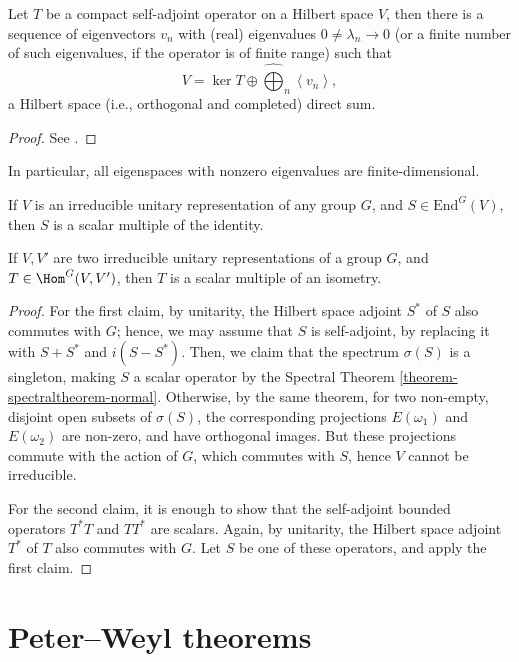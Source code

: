 \begin{theorem}
\label{theorem-spectraltheorem-compact} 
 Let $T$ be a compact self-adjoint operator on a Hilbert space $V$, then there is a sequence of eigenvectors $v_n$ with (real) eigenvalues $0\ne\lambda_n\to 0$ (or a finite number of such eigenvalues, if the operator is of finite range) such that 
 $$V = \ker T \oplus \hat{\bigoplus}_n \left< v_n\right>,$$
a Hilbert space (i.e., orthogonal and completed) direct sum. 
\end{theorem}

\begin{proof}
 See \cite[Theorem 12.30]{Rudin}.
\end{proof}


In particular, all eigenspaces with nonzero eigenvalues are finite-dimensional.


\begin{theorem}
\label{theorem-Schurslemma}
 If $V$ is an irreducible unitary representation of any group $G$, and $S\in \text{End}^G(V)$, then $S$ is a scalar multiple of the identity.
 
 If $V, V'$ are two irreducible unitary representations of a group $G$, and $T \in \Hom^G(V,V')$, then $T$ is a scalar multiple of an isometry. 
\end{theorem}

\begin{proof}
 For the first claim, by unitarity, the Hilbert space adjoint $S^*$ of $S$ also commutes with $G$; hence, we may assume that $S$ is self-adjoint, by replacing it with $S+S^*$ and $i(S-S^*)$. Then, we claim that the spectrum $\sigma(S)$ is a singleton, making $S$ a scalar operator by the Spectral Theorem \ref{theorem-spectraltheorem-normal}. Otherwise, by the same theorem, for two non-empty, disjoint open subsets of $\sigma(S)$, the corresponding projections $E(\omega_1)$ and $E(\omega_2)$ are non-zero, and have orthogonal images. But these projections commute with the action of $G$, which commutes with $S$, hence $V$ cannot be irreducible.
 

 For the second claim, it is enough to show that the self-adjoint bounded operators $T^* T$ and $T T^*$ are scalars. Again, by unitarity, the Hilbert space adjoint $T^*$ of $T$ also commutes with $G$. Let $S$ be one of these operators, and apply the first claim.
 \end{proof}



\section{Peter--Weyl theorems} 
\label{section-PeterWeyl}

